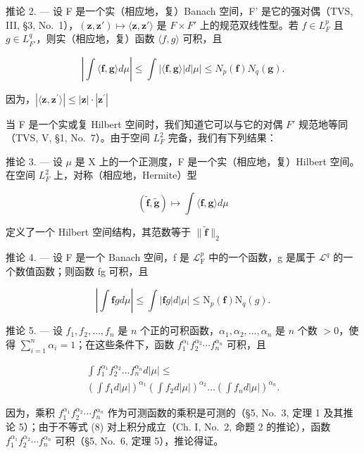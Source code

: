 推论 2. --- 设 F 是一个实（相应地，复）Banach 空间，F' 是它的强对偶（TVS, III, §3, No.~1），\((\mathbf{z}, \mathbf{z}') \mapsto \langle \mathbf{z}, \mathbf{z}' \rangle\) 是 \(F \times F'\) 上的规范双线性型。若 \(f \in L_{F}^{p}\) 且 \(g \in L_{F'}^{q}\)，则实（相应地，复）函数 \(\langle f, g \rangle\) 可积，且

\[
\left| \int \langle \mathbf {f}, \mathbf {g} \rangle d \mu \right| \leqslant \int | \langle \mathbf {f}, \mathbf {g} \rangle | d | \mu | \leqslant N _ {p} (\mathbf {f}) N _ {q} (\mathbf {g}).\tag{6}
\]

因为，\(|\langle \mathbf{z},\mathbf{z}^{\prime}\rangle |\leqslant |\mathbf{z}|\cdot |\mathbf{z}^{\prime}|\)

当 F 是一个实或复 Hilbert 空间时，我们知道它可以与它的对偶 \(F'\) 规范地等同（TVS, V, §1, No.~7）。由于空间 \(L_{F}^{2}\) 完备，我们有下列结果：

推论 3. --- 设 \(\mu\) 是 X 上的一个正测度，F 是一个实（相应地，复）Hilbert 空间。在空间 \(L_{F}^{2}\) 上，对称（相应地，Hermite）型

\[
(\widetilde {\mathbf {f}}, \widetilde {\mathbf {g}}) \mapsto \int \langle \mathbf {f}, \mathbf {g} \rangle d \mu
\]

定义了一个 Hilbert 空间结构，其范数等于 \(\| \widetilde{\mathbf{f}}\| _2\)

推论 4. --- 设 F 是一个 Banach 空间，f 是 \(\mathcal{L}_{\mathrm{F}}^{p}\) 中的一个函数，g 是属于 \(\mathcal{L}^q\) 的一个数值函数；则函数 fg 可积，且

\[
\left| \int \mathbf {f} g d \mu \right| \leqslant \int | \mathbf {f} g | d | \mu | \leqslant \mathrm{N} _ {p} (\mathbf {f}) \mathrm{N} _ {q} (g).\tag{7}
\]

推论 5. --- 设 \(f_1, f_2, \ldots, f_n\) 是 \(n\) 个正的可积函数，\(\alpha_1, \alpha_2, \ldots, \alpha_n\) 是 \(n\) 个数 \(> 0\)，使得 \(\sum_{i=1}^{n} \alpha_i = 1\)；在这些条件下，函数 \(f_1^{\alpha_1} f_2^{\alpha_2} \cdots f_n^{\alpha_n}\) 可积，且

\[
\begin{array}{l} \int f _ {1} ^ {\alpha_ {1}} f _ {2} ^ {\alpha_ {2}} \dots f _ {n} ^ {\alpha_ {n}} d | \mu | \leqslant \\ \left(\int f _ {1} d | \mu |\right) ^ {\alpha_ {1}} \left(\int f _ {2} d | \mu |\right) ^ {\alpha_ {2}} \dots \left(\int f _ {n} d | \mu |\right) ^ {\alpha_ {n}}. \end{array}\tag{8}
\]

因为，乘积 \(f_{1}^{\alpha_{1}}f_{2}^{\alpha_{2}}\cdots f_{n}^{\alpha_{n}}\) 作为可测函数的乘积是可测的（§5, No.~3, 定理 1 及其推论 5）；由于不等式 (8) 对上积分成立（Ch. I, No.~2, 命题 2 的推论），函数 \(f_{1}^{\alpha_{1}}f_{2}^{\alpha_{2}}\cdots f_{n}^{\alpha_{n}}\) 可积（§5, No.~6, 定理 5），推论得证。

